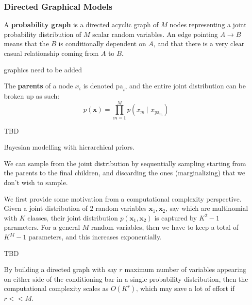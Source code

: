 \documentclass{article}
\begin{document}
    \subsubsection{Directed Graphical Models}

      \begin{definition}  
      A \textbf{probability graph} is a directed acyclic graph of $M$ nodes representing a joint probability distribution of $M$ scalar random variables. An edge pointing $A \rightarrow B$ means that the $B$ is conditionally dependent on $A$, and that there is a very clear casual relationship coming from $A$ to $B$. 
      \begin{center}
        graphics need to be added
      \end{center}
      The \textbf{parents} of a node $x_i$ is denoted $\mathrm{pa}_i$, and the entire joint distribution can be broken up as such: 
      \[p(\mathbf{x}) = \prod_{m=1}^M p(x_m \mid x_{\mathrm{pa}_m})\]
      \end{definition}


      \begin{example}
        TBD
      \end{example} 


      Bayesian modelling with hierarchical priors. 

      \begin{definition} 
      We can sample from the joint distribution by sequentially sampling starting from the parents to the final children, and discarding the ones (marginalizing) that we don't wish to sample. 
      \end{definition}


      \begin{example}
      We first provide some motivation from a computational complexity perspective. Given a joint distribution of 2 random variables $\mathbf{x}_1, \mathbf{x}_2$, say which are multinomial with $K$ classes, their joint distribution $p(\mathbf{x}_1, \mathbf{x}_2)$ is captured by $K^2 - 1$ parameters. For a general $M$ random variables, then we have to keep a total of $K^M - 1$ parameters, and this increases exponentially. 
      \begin{center}
        TBD
      \end{center}
      By building a directed graph with say $r$ maximum number of variables appearing on either side of the conditioning bar in a single probability distribution, then the computational complexity scales as $O(K^r)$, which may save a lot of effort if $r << M$. 
      \end{example}
\end{document}
